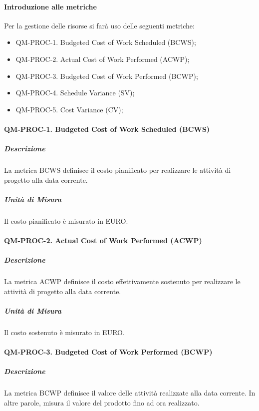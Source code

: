 		\paragraph{Introduzione alle metriche}

		Per la gestione delle risorse si farà uso delle seguenti metriche:

		\begin{itemize}
			\item QM-PROC-1. Budgeted Cost of Work Scheduled (BCWS);
			\item QM-PROC-2. Actual Cost of Work Performed (ACWP);
			\item QM-PROC-3. Budgeted Cost of Work Performed (BCWP);
			\item QM-PROC-4. Schedule Variance (SV);
			\item QM-PROC-5. Cost Variance (CV);
		\end{itemize}

		\paragraph{QM-PROC-1. Budgeted Cost of Work Scheduled (BCWS)}

			\subparagraph{Descrizione}
			La metrica BCWS definisce il costo pianificato per realizzare le attività di progetto alla data corrente. 

			\subparagraph{Unità di Misura}
			Il costo pianificato è misurato in EURO.

		\paragraph{QM-PROC-2. Actual Cost of Work Performed (ACWP)}

			\subparagraph{Descrizione}
			La metrica ACWP definisce il costo effettivamente sostenuto per realizzare le attività di progetto alla data corrente. 

			\subparagraph{Unità di Misura}
			Il costo sostenuto è misurato in EURO.

		\paragraph{QM-PROC-3. Budgeted Cost of Work Performed (BCWP)}

			\subparagraph{Descrizione}
			La metrica BCWP definisce il valore delle attività realizzate alla data corrente. In altre parole, misura il valore del prodotto fino ad ora realizzato.

